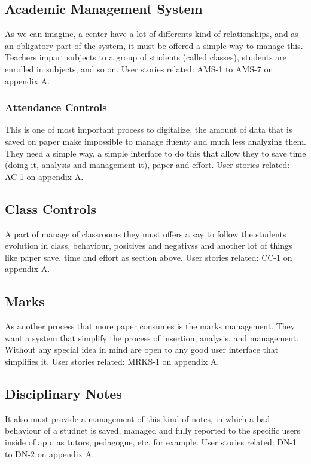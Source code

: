\subsection{Academic Management System}

As we can imagine, a center have a lot of differents kind of relationships,
and as an obligatory part of the system, it must be offered a simple way to manage this.
Teachers impart subjects to a group of students (called classes), students are
enrolled in subjects, and so on.
\intro
User stories related: AMS-1 to AMS-7 on appendix A.

\subsubsection{Attendance Controls}

This is one of most important process to digitalize, the amount of data that is saved on
paper make impossible to manage fluenty and much less  analyzing them.
They need a simple way, a simple interface to do this that allow they to save time
(doing it, analysis and management it), paper and effort.
\intro
User stories related: AC-1 on appendix A.

\subsection{Class Controls}

A part of manage of classrooms they must offers a say to follow the students
evolution in class, behaviour, positives and negativss and another lot of things
like paper save, time and effort as section above.
\intro
User stories related: CC-1 on appendix A.

\subsection{Marks}

As another process that more paper consumes is the marks management.
They want a system that simplify the process of insertion, analysis, and management.
Without any special idea in mind are open to any good user interface that simplifies it.
\intro
User stories related: MRKS-1 on appendix A.

\subsection{Disciplinary Notes}
It also must provide a management of this kind of notes, in which a bad behaviour
of a studnet is saved, managed and fully reported to the specific users inside of
app, as tutors, pedagogue, etc, for example.
\intro
User stories related: DN-1 to DN-2 on appendix A.

